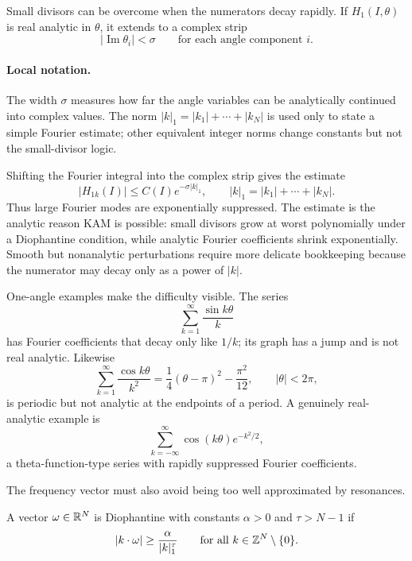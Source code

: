Small divisors can be overcome when the numerators decay rapidly. If
\(H_1(I,\theta)\) is real analytic in \(\theta\), it extends to a complex strip
\[
  |\operatorname{Im}\theta_i|<\sigma
  \qquad\text{for each angle component }i.
\]

\paragraph{Local notation.}
The width \(\sigma\) measures how far the angle variables can be analytically
continued into complex values.  The norm \(|k|_1=|k_1|+\cdots+|k_N|\) is used
only to state a simple Fourier estimate; other equivalent integer norms change
constants but not the small-divisor logic.

Shifting the Fourier integral into the complex strip gives the estimate
\[
  |H_{1k}(I)|\leq C(I)e^{-\sigma |k|_1},
  \qquad
  |k|_1=|k_1|+\cdots+|k_N|.
\]
Thus large Fourier modes are exponentially suppressed.
The estimate is the analytic reason KAM is possible: small divisors grow at
worst polynomially under a Diophantine condition, while analytic Fourier
coefficients shrink exponentially. Smooth but nonanalytic perturbations require
more delicate bookkeeping because the numerator may decay only as a power of
\(|k|\).

\begin{example}
One-angle examples make the difficulty visible. The series
\[
  \sum_{k=1}^{\infty}\frac{\sin k\theta}{k}
\]
has Fourier coefficients that decay only like \(1/k\); its graph has a jump and
is not real analytic. Likewise
\[
  \sum_{k=1}^{\infty}\frac{\cos k\theta}{k^2}
  =
  \frac14(\theta-\pi)^2-\frac{\pi^2}{12},
  \qquad |\theta|<2\pi,
\]
is periodic but not analytic at the endpoints of a period. A genuinely
real-analytic example is
\[
  \sum_{k=-\infty}^{\infty}\cos(k\theta)e^{-k^2/2},
\]
a theta-function-type series with rapidly suppressed Fourier coefficients.
\end{example}

The frequency vector must also avoid being too well approximated by resonances.

\begin{definition}
A vector \(\omega\in\mathbb{R}^N\) is Diophantine with constants \(\alpha>0\) and
\(\tau>N-1\) if
\[
  |k\cdot\omega|
  \geq
  \frac{\alpha}{|k|_1^\tau}
  \qquad
  \text{for all } k\in\mathbb{Z}^N\setminus\{0\}.
\]
\end{definition}

